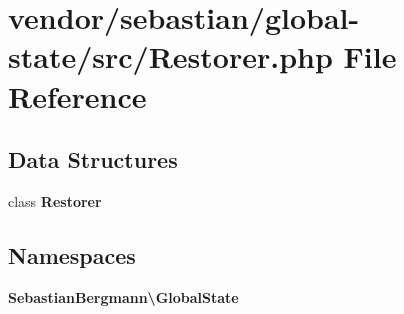 \section{vendor/sebastian/global-\/state/src/\+Restorer.php File Reference}
\label{_restorer_8php}
\subsection*{Data Structures}
\begin{DoxyCompactItemize}
\item 
class {\bf Restorer}
\end{DoxyCompactItemize}
\subsection*{Namespaces}
\begin{DoxyCompactItemize}
\item 
 {\bf Sebastian\+Bergmann\textbackslash{}\+Global\+State}
\end{DoxyCompactItemize}
